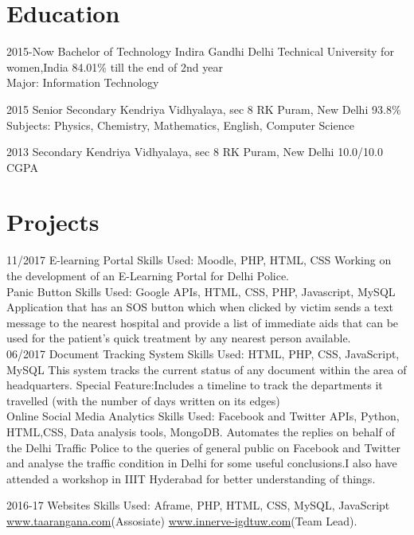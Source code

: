 \documentclass[]{friggeri-cv}
\begin{document}
\section{Education}
\begin{entrylist}
  \entry
    {2015-Now}
    {Bachelor of Technology}
    {Indira Gandhi Delhi Technical University for women,India}
    {84.01\% till the end of 2nd year\\
    Major: Information Technology\\}
    
  \entry
    {2015}
    {Senior Secondary}
    {Kendriya Vidhyalaya, sec 8 RK Puram, New Delhi}
    {93.8\% \\
    Subjects: Physics, Chemistry, Mathematics, English, Computer Science\\}
 
  \entry
    {2013}
    {Secondary}
    {Kendriya Vidhyalaya, sec 8 RK Puram, New Delhi}
    {10.0/10.0 CGPA \\}
\end{entrylist}

\section{Projects}
\begin{entrylist}
 \entry
    {11/2017}
    {E-learning Portal   }
    { Skills Used: Moodle, PHP, HTML, CSS }
    {  Working on the development of an E-Learning Portal for Delhi Police.\\}
    {Panic Button }
    { Skills Used: Google APIs, HTML, CSS, PHP, Javascript, MySQL}
    {Application that has an SOS button which when clicked by victim sends a text message to the nearest hospital and provide a list of immediate aids that can be used for the patient’s quick treatment by any nearest person available. \\}
  \entry
    {06/2017}
    {Document Tracking System }
    {Skills Used: HTML, PHP, CSS, JavaScript, MySQL}
    {This system tracks the current status of any document within the area of headquarters. Special Feature:Includes a timeline to track the departments it travelled (with the number of days written on its edges)\\}
    {Online Social Media Analytics}
    { Skills Used: Facebook and Twitter APIs, Python, HTML,CSS, Data analysis tools, MongoDB.}
    {Automates the replies on behalf of the Delhi Traffic Police to the queries of general public on Facebook and Twitter and analyse the traffic condition in Delhi for some useful conclusions.I also have attended a workshop in IIIT Hyderabad for better understanding of things.\\}

\entry
    {2016-17}
    {Websites}
    { Skills Used: Aframe, PHP, HTML, CSS, MySQL, JavaScript }
    {  \href{http://www.taarangana.com}{www.taarangana.com}(Assosiate)
       \href{http://www.innerve-igdtuw.com}{www.innerve-igdtuw.com}(Team Lead).\\}
\end{entrylist}
\end{document}
